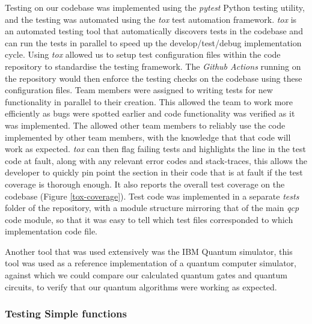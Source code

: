 \documentclass{article}
\begin{document}
Testing on our codebase was implemented using the \textit{pytest}\cite{noauthor_pytest_nodate} Python testing utility, and the testing was automated using the \textit{tox}\cite{noauthor_welcome_nodate} test automation framework.
\textit{tox} is an automated testing tool that automatically discovers tests in the codebase and can run the tests in parallel to speed up the develop/test/debug implementation cycle. 
Using \textit{tox} allowed us to setup test configuration files within the code repository to standardise the testing framework. The \textit{Github Actions} running on the repository would then enforce the testing checks on the codebase using these configuration files. 
Team members were assigned to writing tests for new functionality in parallel to their creation. 
This allowed the team to work more efficiently as bugs were spotted earlier and code functionality was verified as it was implemented. 
The allowed other team members to reliably use the code implemented by other team members, with the knowledge that that code will work as expected. 
\textit{tox} can then flag failing tests and highlights the line in the test code at fault, along with any relevant error codes and stack-traces, this allows the developer to quickly pin point the section in their code that is at fault if the test coverage is thorough enough. 
It also reports the overall test coverage on the codebase (Figure \ref{tox-coverage}). 
Test code was implemented in a separate \textit{tests} folder of the repository, with a module structure mirroring that of the main \textit{qcp} code module, so that it was easy to tell which test files corresponded to which implementation code file.

\medskip

Another tool that was used extensively was the IBM Quantum simulator\cite{noauthor_programming_nodate}, this tool was used as a reference implementation of a quantum computer simulator, against which we could compare our calculated quantum gates and quantum circuits, to verify that our quantum algorithms were working as expected.

\subsubsection{Testing Simple functions}
\end{document}
